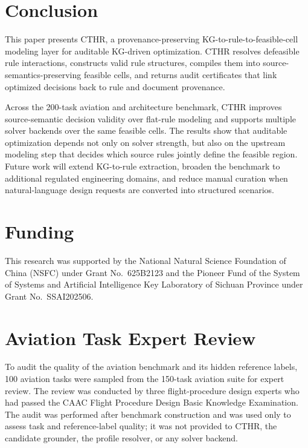﻿\documentclass[a4paper,fleqn]{cas-dc}
\newcommand{\CTHR}{\textsc{CTHR}}
\begin{document}
\section{Conclusion}
\label{sec:conclusion}

This paper presents \CTHR{}, a provenance-preserving KG-to-rule-to-feasible-cell
modeling layer for auditable KG-driven optimization. \CTHR{} resolves
defeasible rule interactions, constructs valid rule structures, compiles them
into source-semantics-preserving feasible cells, and returns audit certificates
that link optimized decisions back to rule and document provenance.

Across the 200-task aviation and architecture benchmark, \CTHR{} improves
source-semantic decision validity over flat-rule modeling and supports multiple
solver backends over the same feasible cells. The results show that auditable
optimization depends not only on solver strength, but also on the upstream
modeling step that decides which source rules jointly define the feasible
region. Future work will extend KG-to-rule extraction, broaden the benchmark to
additional regulated engineering domains, and reduce manual curation when
natural-language design requests are converted into structured scenarios.

\section*{Funding}
This research was supported by the National Natural Science Foundation of China
(NSFC) under Grant No.~625B2123 and the Pioneer Fund of the System of Systems
and Artificial Intelligence Key Laboratory of Sichuan Province under Grant
No.~SSAI202506.

\appendix
\setcounter{table}{0}
\renewcommand{\thetable}{A.\arabic{table}}

\section{Aviation Task Expert Review}
\label{app:aviation_expert_review}

To audit the quality of the aviation benchmark and its hidden reference labels,
100 aviation tasks were sampled from the 150-task aviation suite for expert
review. The review was conducted by three flight-procedure design experts who
had passed the CAAC Flight Procedure Design Basic Knowledge Examination. The
audit was performed after benchmark construction and was used only to assess
task and reference-label quality; it was not provided to \CTHR{}, the candidate
grounder, the profile resolver, or any solver backend.
\end{document}
